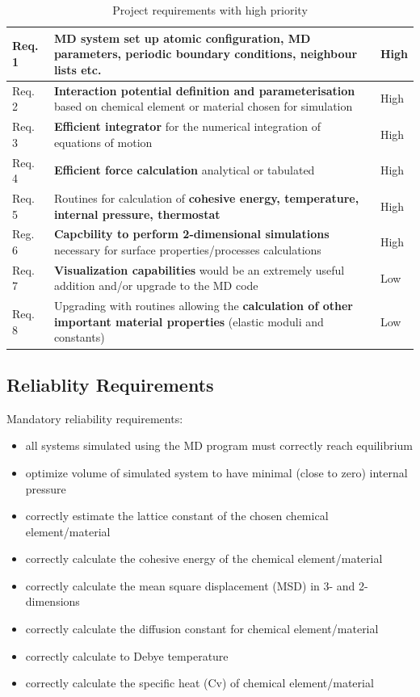 \documentclass[12pt,a4paper]{article}
\begin{document}
\begin{table}[h]
\caption{Project requirements with high priority}
\begin{tabular}{| p{} | p{} | p{} |}
	\hline
	Req. 1 & \textbf{MD system set up} atomic configuration, MD parameters, periodic boundary conditions,  neighbour lists etc. & High \\
	\hline
	Req. 2 & \textbf{Interaction potential definition and parameterisation} based on chemical element or material chosen for simulation & High \\
	\hline
	Req. 3 & \textbf{Efficient integrator} for the numerical integration of equations of motion & High \\
	\hline
	Req. 4 & \textbf{Efficient force calculation} analytical or tabulated & High \\
	\hline
	Req. 5 & Routines for calculation of  \textbf{cohesive energy, temperature, internal pressure, thermostat} & High \\
	\hline
	Reg. 6 & \textbf{Capcbility to perform 2-dimensional simulations} necessary for surface properties/processes calculations & High \\
	\hline 
	Req. 7 & \textbf{Visualization capabilities} would be an extremely useful addition and/or upgrade to the MD code & Low \\
	\hline
	Req. 8 & Upgrading with routines allowing the \textbf{calculation of other important material properties} (elastic moduli and constants) & Low \\
	\hline
\end{tabular}
\label{tab:Requirements}
\end{table}

\subsection{Reliablity Requirements}
Mandatory reliability requirements:
\begin{itemize}
\item all systems simulated using the MD program must correctly reach equilibrium
\item optimize volume of simulated system to have minimal (close to zero) internal pressure
\item correctly estimate the lattice constant of the chosen chemical element/material
\item correctly calculate the cohesive energy of the chemical element/material
\item correctly calculate the mean square displacement (MSD) in 3- and 2-dimensions
\item correctly calculate the diffusion constant for chemical element/material
\item correctly calculate to Debye temperature
\item correctly calculate the specific heat (Cv) of chemical element/material
\end{itemize}
\end{document}
